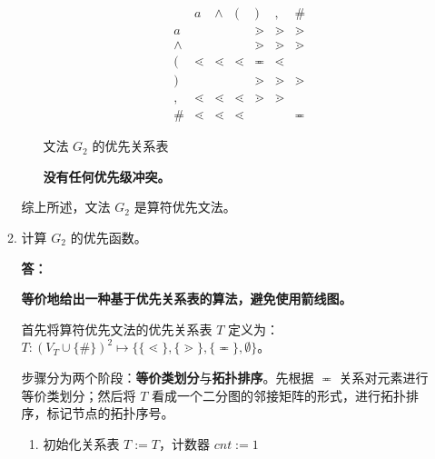 \begin{enumerate}
\begin{enumerate}
\begin{enumerate}
            \begin{table}[H]
                \centering
                \begin{equation*}
                    \begin{array}{c|cccccc}
                          & a & \wedge & ( & ) & , & \# \\
                        \hline
                        a & & & & \gtrdot & \gtrdot & \gtrdot \\
                        \wedge & & & & \gtrdot & \gtrdot & \gtrdot \\
                        ( & \lessdot & \lessdot & \lessdot & \eqcirc & \lessdot & \\
                        ) & & & & \gtrdot & \gtrdot & \gtrdot \\
                        , & \lessdot & \lessdot & \lessdot & \gtrdot & \gtrdot & \\
                        \# & \lessdot & \lessdot & \lessdot & & & \eqcirc 
                    \end{array}
                \end{equation*}
                \caption{文法 $G_2$ 的优先关系表}
                \label{tab:PT_3}
            \end{table}
            
        
            \textbf{没有任何优先级冲突。}
            
        \end{enumerate}
        
        综上所述，文法 $G_2$ 是算符优先文法。
        
        \item 计算 $G_2$ 的优先函数。
        
        \textbf{答：}
        
        \textbf{等价地给出一种基于优先关系表的算法，避免使用箭线图。}
        
        首先将算符优先文法的优先关系表 $T$ 定义为：$T: (V_T \cup \{\#\})^2 \mapsto \{\{\lessdot\}, \{\gtrdot\}, \{\eqcirc\}, \emptyset \} $。
        
        步骤分为两个阶段：\textbf{等价类划分}与\textbf{拓扑排序}。先根据 $\eqcirc$ 关系对元素进行等价类划分；然后将 $T$ 看成一个二分图的邻接矩阵的形式，进行拓扑排序，标记节点的拓扑序号。
        
        \begin{enumerate}
            \item 初始化关系表 $T := T$，计数器 $cnt := 1$
            

\end{enumerate}
\end{enumerate}
\end{enumerate}
